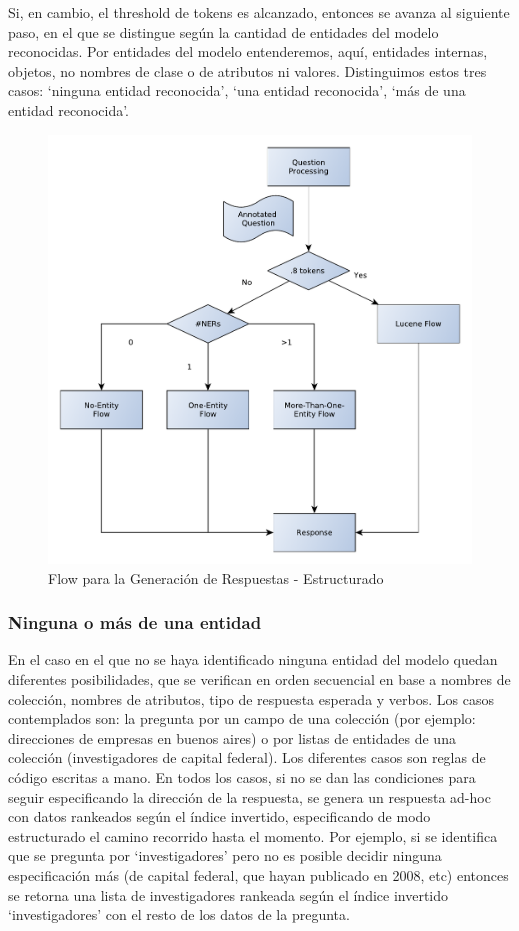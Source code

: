 Si, en cambio, el threshold de tokens es alcanzado, entonces se avanza al siguiente paso, en el que se distingue según la cantidad de entidades del modelo reconocidas. Por entidades del modelo entenderemos, aquí, entidades internas, objetos, no nombres de clase o de atributos ni valores. Distinguimos estos tres casos: `ninguna entidad reconocida', `una entidad reconocida', `más de una entidad reconocida'.



\begin{figure}[H]
  \centering
    \includegraphics[scale=0.5]{graficos/AnswerRetrievalFlowEstructurado}
  \caption{Flow para la Generación de Respuestas - Estructurado}
  \label{fig:AnswerRetrievalFlowEstructurado}
\end{figure}

\subsubsection*{Ninguna o más de una entidad}
En el caso en el que no se haya identificado ninguna entidad del modelo quedan diferentes posibilidades, que se verifican en orden secuencial en base a nombres de colección, nombres de atributos, tipo de respuesta esperada y verbos. Los casos contemplados son: la pregunta por un campo de una colección (por ejemplo: direcciones de empresas en buenos aires) o por listas de entidades de una colección (investigadores de capital federal). Los diferentes casos son reglas de código escritas a mano. En todos los casos, si no se dan las condiciones para seguir especificando la dirección de la respuesta, se genera un respuesta ad-hoc con datos rankeados según el índice invertido, especificando de modo estructurado el camino recorrido hasta el momento. Por ejemplo, si se identifica que se pregunta por `investigadores' pero no es posible decidir ninguna especificación más (de capital federal, que hayan publicado en 2008, etc) entonces se retorna una lista de investigadores rankeada según el índice invertido `investigadores' con el resto de los datos de la pregunta. 


